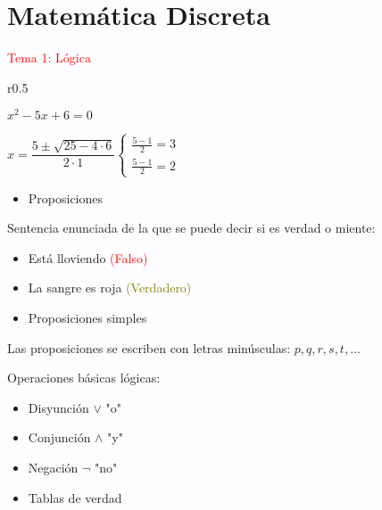 \documentclass[12pt]{article}
\begin{document}
\section*{Matemática Discreta}
\textcolor{red}{Tema 1: Lógica}

\begin{wrapfigure}[2]{r}{0.5\linewidth}
\end{wrapfigure}

$x^2-5x+6=0$

$x=\dfrac{5\pm\sqrt{25-4\cdot6}}{2\cdot 1}\left\{\begin{array}{l}
	\frac{5-1}{2}=3\\
	\frac{5-1}{2}=2
\end{array}\right.$

\begin{itemize}[label=\color{red}\textbullet, leftmargin=*]
	\item \color{lightblue} Proposiciones
\end{itemize}
Sentencia enunciada de la que se puede decir si es verdad o miente:
\begin{itemize}[label=\color{lightblue}$\rightarrow$]
	\item Está lloviendo  \textcolor{red}{(Falso)}
	\item La sangre es roja \textcolor{olive}{(Verdadero)}
\end{itemize}
\begin{itemize}[label=\color{red}\textbullet, leftmargin=*]
	\item \color{lightblue} Proposiciones simples
\end{itemize}
Las proposiciones se escriben  con letras minúsculas: $p,q,r,s,t,\hdots$

Operaciones básicas lógicas:
\begin{itemize}[label=$-$]
	\item Disyunción $\vee$ "o"
	\item Conjunción $\wedge$ "y"
	\item Negación $\neg $ "no"
\end{itemize}
\begin{itemize}[label=\color{red}\textbullet, leftmargin=*]
	\item \color{lightblue}Tablas de verdad
\end{itemize}
\end{document}
